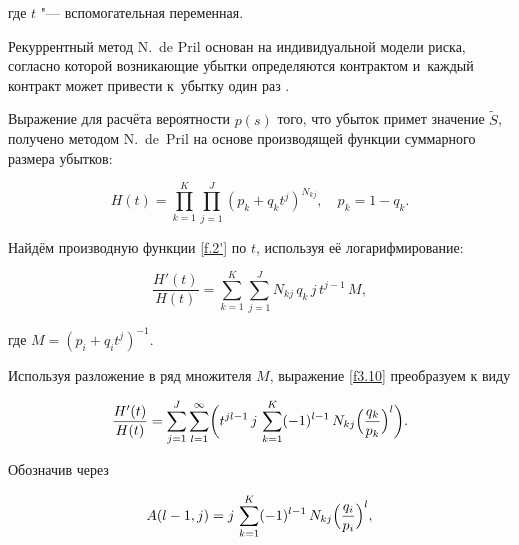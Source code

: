 где $t$ "--- вспомогательная переменная.



\smallskip




Рекуррентный метод N.~de Pril \cite{Mihailova:bib:De_Pril1, Mihailova:bib:De_Pril2} основан на индивидуальной модели риска, согласно которой возникающие убытки определяются контрактом и~каждый контракт может привести к~убытку один раз \cite{Mihailova:bib:Falin, Mihailova:bib:Korolev}.



Выражение для расчёта вероятности $p(s)$ того, что убыток примет значение $\widetilde{S}$, получено методом N.~de~Pril  на основе производящей функции суммарного размера убытков:

\begin{equation}

\label{f.2'}

H(t)=\prod_{k=1}^{K}\prod_{j=1}^{J}(p_k+q_k t^j) ^{N_{kj}},\quad p_k=1-q_k.

\end{equation}

Найдём производную функции \eqref{f.2'} по $t$, используя её логарифмирование:

\begin{equation}

\label{f3.10}

\frac{H'(t)}{H(t)}=

\sum_{k=1}^K\sum_{j=1}^J N_{kj} \, q_k \, j \, t^{j-1} \, M, 

\end{equation}

где $M = (p_i+q_i t^j)^{-1}$.

Используя разложение в ряд множителя $M$, выражение \eqref{f3.10} преобразуем к виду

\begin{equation}

\label{f.5}

\frac{H'(t)}{H(t)}=

\sum_{j=1}^J \sum_{l=1}^{\infty} \biggl( t^{jl-1} \, j \, \sum_{k=1}^K (-1)^{l-1} \, N_{kj} \Bigl (\frac{q_k}{p_k}\Bigr)^l \biggr).

\end{equation}

Обозначив через

\begin{equation}

\label{f3.11}

A(l-1,j)=j\, \sum_{k=1}^K (-1)^{l-1} \, N_{kj} \Bigl (\frac{q_i}{p_i}\Bigr)^l,

\end{equation}

